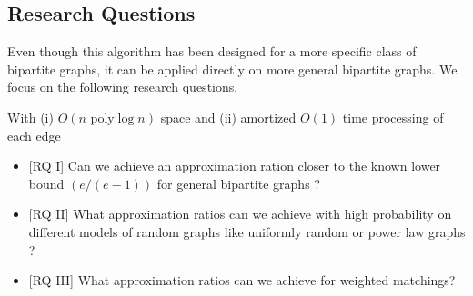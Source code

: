 \documentclass{scrartcl}
\begin{document}
\subsection{Research Questions}

Even though this algorithm has been designed for a more specific class of bipartite graphs, it can be applied directly on more general bipartite graphs. We focus on the following research questions.

With (i) $O(n \text{ poly} \log n)$ space and  (ii) amortized $O(1)$ time processing of each edge
\begin{itemize}
\item  \textsf{[RQ I]} Can we achieve an approximation ration closer to the known lower bound $(e/(e-1))$ for general bipartite graphs ?
\item \textsf{[RQ II]} What approximation ratios can we achieve with high probability on different models of random graphs like uniformly random or power law graphs ?
\item \textsf{[RQ III]} What approximation ratios can we achieve for weighted matchings?

\end{itemize}

%

\end{document}
